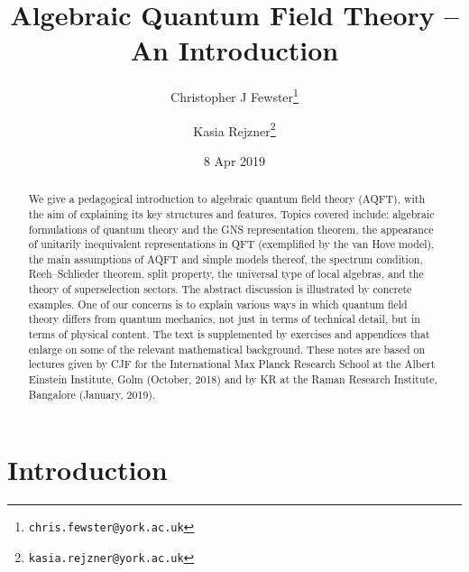 \documentclass[12pt,a4paper]{article}
\newcommand{\1}{\mathds{1}}                         %
\begin{document}
	\title{Algebraic Quantum Field Theory --\\ An Introduction} 
	
	
	\author[1]{Christopher J Fewster\thanks{\tt chris.fewster@york.ac.uk}}
	\author[1]{Kasia Rejzner\thanks{\tt kasia.rejzner@york.ac.uk}}
 
	\date{8 Apr 2019}%
	\maketitle 
	\begin{abstract}  
	We give a pedagogical introduction to algebraic quantum field theory (AQFT), with the aim of explaining its key structures and features. Topics covered include: algebraic formulations of quantum theory and the GNS representation theorem, the appearance of unitarily inequivalent representations in QFT (exemplified by the van Hove model), the main assumptions of AQFT and simple models thereof, the spectrum condition, Reeh--Schlieder theorem, split property, the universal type of local algebras, and the theory of superselection sectors. The abstract discussion is illustrated by concrete examples. One of our concerns is to explain various ways in which quantum field theory differs from quantum mechanics, not just in terms of technical detail, but in terms of physical content. 
	The text is supplemented by exercises and appendices that enlarge on some of the relevant mathematical background. These notes are based on lectures given by CJF for the International Max Planck Research School at the Albert Einstein Institute, Golm (October, 2018) and by KR at the Raman Research Institute, Bangalore (January, 2019). 
	\end{abstract} 
	\newpage
	\tableofcontents 
	\newpage
	\section{Introduction}
		
\end{document}
